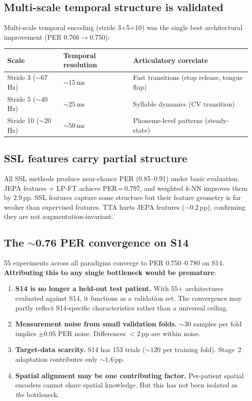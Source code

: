 \documentclass[11pt,letterpaper]{article}
\newcommand{\pp}{\,\text{pp}}
\begin{document}
\subsection{Multi-scale temporal structure is validated}

Multi-scale temporal encoding (stride 3+5+10) was the single best architectural improvement (PER $0.766 \to 0.750$):

\begin{table}[h]
\centering\small
\begin{tabular}{@{}lll@{}}
\toprule
\textbf{Scale} & \textbf{Temporal resolution} & \textbf{Articulatory correlate} \\
\midrule
Stride 3 (${\sim}67$\,Hz) & ${\sim}15$\,ms & Fast transitions (stop release, tongue flap) \\
Stride 5 (${\sim}40$\,Hz) & ${\sim}25$\,ms & Syllable dynamics (CV transition) \\
Stride 10 (${\sim}20$\,Hz) & ${\sim}50$\,ms & Phoneme-level patterns (steady-state) \\
\bottomrule
\end{tabular}
\end{table}

\subsection{SSL features carry partial structure}

All SSL methods produce near-chance PER (0.85--0.91) under basic evaluation. JEPA features + LP-FT achieve PER\,=\,0.797, and weighted $k$-NN improves them by $2.9\pp$. SSL features capture some structure but their feature geometry is far weaker than supervised features. TTA hurts JEPA features ($-0.2\pp$), confirming they are not augmentation-invariant.

\subsection{The ${\sim}$0.76 PER convergence on S14}\label{sec:wall}

55 experiments across all paradigms converge to PER 0.750--0.780 on S14. \textbf{Attributing this to any single bottleneck would be premature}:

\begin{enumerate}[leftmargin=2em]
\item \textbf{S14 is no longer a held-out test patient.} With 55+ architectures evaluated against S14, it functions as a validation set. The convergence may partly reflect S14-specific characteristics rather than a universal ceiling.
\item \textbf{Measurement noise from small validation folds.} ${\sim}30$ samples per fold implies ${\pm}0.05$ PER noise. Differences ${<}2\pp$ are within noise.
\item \textbf{Target-data scarcity.} S14 has 153 trials (${\sim}120$ per training fold). Stage~2 adaptation contributes only ${\sim}1.6\pp$.
\item \textbf{Spatial alignment may be one contributing factor.} Per-patient spatial encoders cannot share spatial knowledge. But this has not been isolated as \emph{the} bottleneck.
\end{enumerate}
\end{document}
